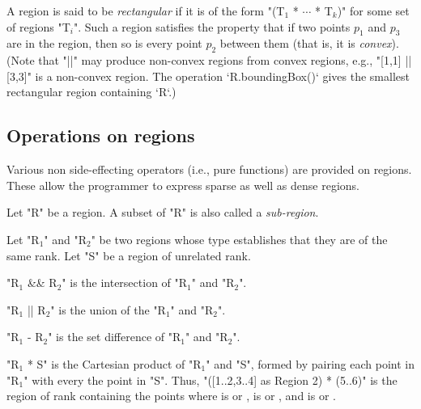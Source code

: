 A region is said to be {\em rectangular} if it is of
the form \xcdmath"(T$_1$ * $\cdots$ * T$_k$)" for some set of regions
\xcdmath"T$_i$". Such a
region satisfies the property that if two points $p_1$ and $p_3$ are
in the region, then so is every point $p_2$ between them (that is, it is {\em convex}). 
(Note that \xcd"||" may produce non-convex regions from convex regions, e.g.,
\xcd"[1,1] || [3,3]" is a non-convex region.  The operation
\xcd`R.boundingBox()` gives the smallest rectangular region containing
\xcd`R`.)  






\subsection{Operations on regions}
Various non side-effecting operators (i.e., pure functions) are
provided on regions. These allow the programmer to express sparse as
well as dense regions.

Let \xcd"R" be a region. A subset of \xcd"R" is also called a
{\em sub-region}.

Let \xcdmath"R$_1$" and \xcdmath"R$_2$" be two regions whose type
establishes that they are of the same rank. Let 
\xcdmath"S" be a region of unrelated rank.

\xcdmath"R$_1$ && R$_2$" is the intersection of \xcdmath"R$_1$" and
\xcdmath"R$_2$". 


\xcdmath"R$_1$ || R$_2$" is the union of the \xcdmath"R$_1$" and
\xcdmath"R$_2$".

\xcdmath"R$_1$ - R$_2$" is the set difference of \xcdmath"R$_1$" and
\xcdmath"R$_2$".

\xcdmath"R$_1$ * S" is the Cartesian product of \xcdmath"R$_1$" and
\xcdmath"S",  formed by pairing each point in \xcdmath"R$_1$" with every the point in \xcdmath"S".
Thus, \xcd"([1..2,3..4] as Region 2) * (5..6)"
is the region of rank  containing the points 
where  is  or , 
 is  or , and
 is  or . 


